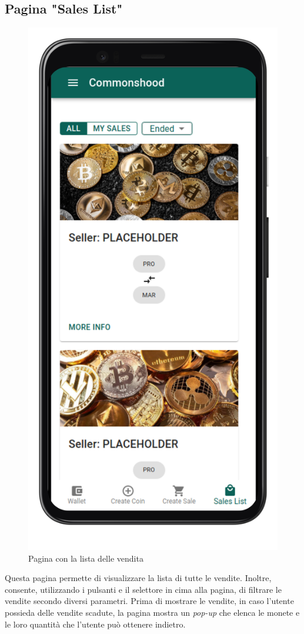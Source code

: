 \documentclass[a4paper]{article}
\begin{document}
        \subsection{Pagina "Sales List"}
        \begin{figure}[H]
          \includegraphics[scale=0.16]{salesList.png}
          \centering
          \caption{Pagina con la lista delle vendita}
          \centering
          \label{fig:salesList}
        \end{figure}
        Questa pagina permette di visualizzare la lista di tutte le vendite. Inoltre, consente, utilizzando i pulsanti e il selettore in cima alla pagina, di filtrare le vendite secondo diversi parametri.
        Prima di mostrare le vendite, in caso l'utente possieda delle vendite scadute, la pagina mostra un \emph{pop-up} che elenca le monete e le loro quantità che l'utente può ottenere indietro.
\end{document}

